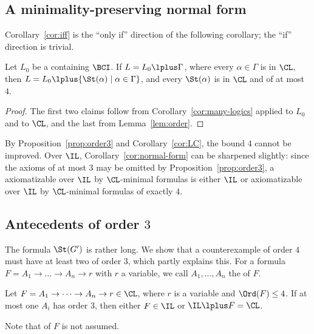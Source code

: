 \subsection{A minimality-preserving normal form}

Corollary~\ref{cor:iff} is the ``only if'' direction of the
following corollary; the ``if'' direction is trivial.

\begin{corollary}\label{cor:normal-form}
Let $L_0$ be a  containing $\BCI$. If $L=L_0\lplus\Gamma$, where
every $\alpha\in\Gamma$ is  in $\CL$, then
$L=L_0\lplus\{\St(\alpha)\mid\alpha\in\Gamma\}$, and every $\St(\alpha)$ is
 in $\CL$ and of  at most $4$.
\end{corollary}
\begin{proof}
The first two claims follow from Corollary~\ref{cor:many-logics} applied to
$L_0$ and to $\CL$, and the last from Lemma~\ref{lem:order}.
\end{proof}

By Proposition~\ref{prop:order3} and Corollary~\ref{cor:LC}, the bound $4$
cannot be improved. Over $\IL$, Corollary~\ref{cor:normal-form} can be
sharpened slightly: since the axioms of  at most $3$ may be
omitted by Proposition~\ref{prop:order3}, a  axiomatizable over
$\IL$ by $\CL$-minimal formulas is either $\IL$ or axiomatizable over $\IL$
by $\CL$-minimal formulas of  exactly $4$.

\subsection{Antecedents of order \texorpdfstring{$3$}{3}}\label{sec:order3}

The formula $\St(G')$ is rather long. We show that a counterexample of
order $4$ must have at least two  of order $3$, which
partly explains this. For a formula $F=A_1\to\dots\to A_n\to r$ with $r$ a variable, we call
$A_1,\dots,A_n$ the  of $F$.

\begin{proposition}\label{prop:one-premise}
Let $F=A_1\to\dots\to A_n\to r\in\CL$, where $r$ is a variable and
$\Ord(F)\le4$. If at most one $A_i$ has order $3$, then either $F\in\IL$
or $\IL\lplus F=\CL$.
\end{proposition}

Note that  of $F$ is not assumed.

